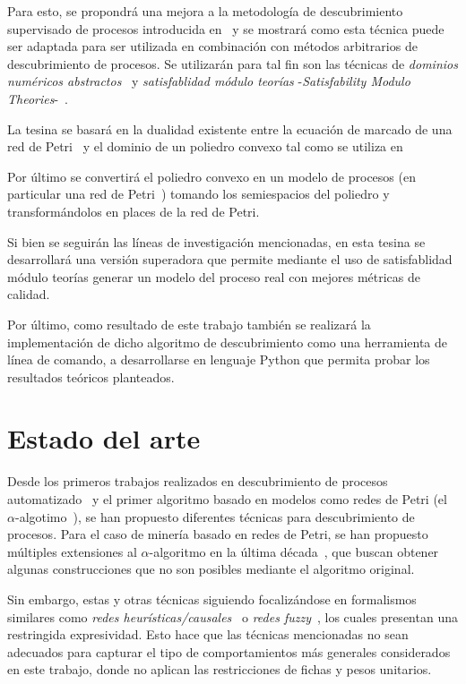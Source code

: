 Para esto, se propondrá una mejora a la metodología de descubrimiento supervisado de procesos introducida en~\cite{LeonCB15}
y se mostrará como esta técnica puede ser adaptada para ser utilizada en combinación con métodos arbitrarios
de descubrimiento de procesos. Se utilizarán para tal fin son las técnicas de
\textit{dominios numéricos abstractos}~\cite{Rockafellar70} y \textit{satisfablidad módulo teorías}
-\textit{Satisfability Modulo Theories}-~\cite{NieuwenhuisOT06}.

La tesina se basará en la dualidad existente entre la ecuación de marcado de una red de Petri~\cite{SilvaTC96}
y el dominio de un poliedro convexo tal como se utiliza en~\cite{CarmonaC14}

Por último se convertirá el poliedro convexo en un modelo de procesos (en particular una red de Petri~\cite{Murata89})
tomando los semiespacios del poliedro y transformándolos en places de la red de Petri.

Si bien se seguirán las líneas de investigación mencionadas, en esta tesina se desarrollará una versión superadora 
que permite mediante el uso de satisfablidad módulo teorías generar un modelo del proceso real con mejores métricas
de calidad.

Por último, como resultado de este trabajo también se realizará la implementación de dicho algoritmo de descubrimiento como una 
herramienta de línea de comando, a desarrollarse en lenguaje Python que permita probar los resultados
teóricos planteados.

\section{Estado del arte}
\label{sec:esatdo_del_arte}

Desde los primeros trabajos realizados en descubrimiento de procesos automatizado~\cite{CookW98, AgrawalGL98} y el primer
algoritmo basado en modelos como redes de Petri (el $\alpha$-algotimo~\cite{AalstWM04}), se han propuesto diferentes
técnicas para descubrimiento de procesos. 
Para el caso de minería basado en redes de Petri, se han propuesto múltiples extensiones al
$\alpha$-algoritmo en la última década~\cite{MedeirosAW03,WenAWS07,GuoWWYY15}, que buscan obtener algunas
construcciones que no son posibles mediante el algoritmo original.


Sin embargo, estas y otras técnicas siguiendo focalizándose en formalismos similares como
\emph{redes heurísticas/causales}~\cite{WeijtersR11} o \emph{redes fuzzy}~\cite{AalstG07}, los cuales presentan
una restringida expresividad.
Esto hace que las técnicas mencionadas no sean adecuados para capturar el tipo de comportamientos más generales
considerados en este trabajo, donde no aplican las restricciones de fichas y pesos unitarios.

